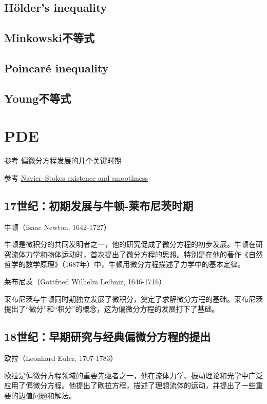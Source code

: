 \documentclass{article}
\begin{document}
\subsection{H\"older's inequality}

\subsection{Minkowski不等式}

\subsection{Poincar\'e inequality}

\subsection{Young不等式}


\section{PDE}
参考 \href{https://mp.weixin.qq.com/s/AQVFTTRiSRScClZ0OnxGCQ}{偏微分方程发展的几个关键时期}

参考 \href{https://en.wikipedia.org/wiki/Navier%E2%80%93Stokes_existence_and_smoothness}{Navier–Stokes existence and smoothness}

\subsection{17世纪：初期发展与牛顿-莱布尼茨时期}

牛顿（Isaac Newton, 1642-1727）

牛顿是微积分的共同发明者之一，他的研究促成了微分方程的初步发展。牛顿在研究流体力学和物体运动时，首次提出了微分方程的思想。特别是在他的著作《自然哲学的数学原理》（1687年）中，牛顿用微分方程描述了力学中的基本定律。

莱布尼茨（Gottfried Wilhelm Leibniz, 1646-1716）

莱布尼茨与牛顿同时期独立发展了微积分，奠定了求解微分方程的基础。莱布尼茨提出了“微分”和“积分”的概念，这为偏微分方程的发展打下了基础。

\subsection{18世纪：早期研究与经典偏微分方程的提出}

欧拉（Leonhard Euler, 1707-1783）

欧拉是偏微分方程领域的重要先驱者之一，他在流体力学、振动理论和光学中广泛应用了偏微分方程。他提出了欧拉方程，描述了理想流体的运动，并提出了一些重要的边值问题和解法。
\end{document}
